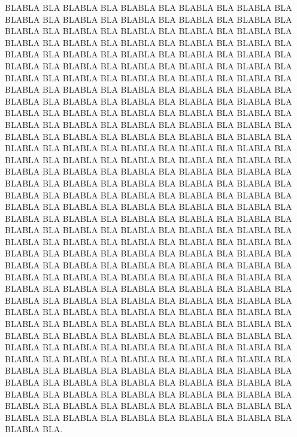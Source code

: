 \documentclass[a4paper, 12pt]{article}
\begin{document}
\begin{doublespace}
BLABLA BLA BLABLA BLA BLABLA BLA BLABLA BLA BLABLA BLA BLABLA BLA BLABLA BLA BLABLA BLA BLABLA BLA BLABLA BLA BLABLA BLA BLABLA BLA BLABLA BLA BLABLA BLA BLABLA BLA BLABLA BLA BLABLA BLA BLABLA BLA BLABLA BLA BLABLA BLA BLABLA BLA BLABLA BLA BLABLA BLA BLABLA BLA BLABLA BLA BLABLA BLA BLABLA BLA BLABLA BLA BLABLA BLA BLABLA BLA BLABLA BLA BLABLA BLA BLABLA BLA BLABLA BLA BLABLA BLA BLABLA BLA BLABLA BLA BLABLA BLA BLABLA BLA BLABLA BLA BLABLA BLA BLABLA BLA BLABLA BLA BLABLA BLA BLABLA BLA BLABLA BLA BLABLA BLA BLABLA BLA BLABLA BLA BLABLA BLA BLABLA BLA BLABLA BLA BLABLA BLA BLABLA BLA BLABLA BLA BLABLA BLA BLABLA BLA BLABLA BLA BLABLA BLA BLABLA BLA BLABLA BLA BLABLA BLA BLABLA BLA BLABLA BLA BLABLA BLA BLABLA BLA BLABLA BLA BLABLA BLA BLABLA BLA BLABLA BLA BLABLA BLA BLABLA BLA BLABLA BLA BLABLA BLA BLABLA BLA BLABLA BLA BLABLA BLA BLABLA BLA BLABLA BLA BLABLA BLA BLABLA BLA BLABLA BLA BLABLA BLA BLABLA BLA BLABLA BLA BLABLA BLA BLABLA BLA BLABLA BLA BLABLA BLA BLABLA BLA BLABLA BLA BLABLA BLA BLABLA BLA BLABLA BLA BLABLA BLA BLABLA BLA BLABLA BLA BLABLA BLA BLABLA BLA BLABLA BLA BLABLA BLA BLABLA BLA BLABLA BLA BLABLA BLA BLABLA BLA BLABLA BLA BLABLA BLA BLABLA BLA BLABLA BLA BLABLA BLA BLABLA BLA BLABLA BLA BLABLA BLA BLABLA BLA BLABLA BLA BLABLA BLA BLABLA BLA BLABLA BLA BLABLA BLA BLABLA BLA BLABLA BLA BLABLA BLA BLABLA BLA BLABLA BLA BLABLA BLA BLABLA BLA BLABLA BLA BLABLA BLA BLABLA BLA BLABLA BLA BLABLA BLA BLABLA BLA BLABLA BLA BLABLA BLA BLABLA BLA BLABLA BLA BLABLA BLA BLABLA BLA BLABLA BLA BLABLA BLA BLABLA BLA BLABLA BLA BLABLA BLA BLABLA BLA BLABLA BLA BLABLA BLA BLABLA BLA BLABLA BLA BLABLA BLA BLABLA BLA BLABLA BLA BLABLA BLA BLABLA BLA BLABLA BLA BLABLA BLA BLABLA BLA BLABLA BLA BLABLA BLA BLABLA BLA BLABLA BLA BLABLA BLA BLABLA BLA BLABLA BLA BLABLA BLA BLABLA BLA BLABLA BLA BLABLA BLA BLABLA BLA BLABLA BLA BLABLA BLA BLABLA BLA BLABLA BLA BLABLA BLA BLABLA BLA BLABLA BLA BLABLA BLA BLABLA BLA BLABLA BLA BLABLA BLA BLABLA BLA BLABLA BLA.
\end{doublespace}
\end{document}
